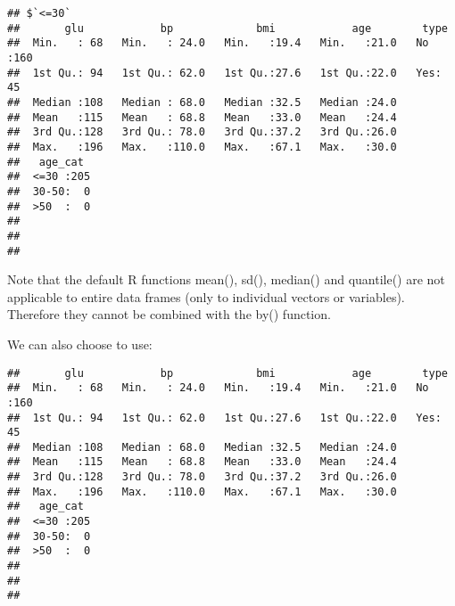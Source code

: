 \documentclass[]{book}
\newenvironment{Shaded}{\begin{snugshade}}{\end{snugshade}}
\newcommand{\KeywordTok}[1]{\textcolor[rgb]{0.13,0.29,0.53}{\textbf{#1}}}
\newcommand{\DecValTok}[1]{\textcolor[rgb]{0.00,0.00,0.81}{#1}}
\newcommand{\OperatorTok}[1]{\textcolor[rgb]{0.81,0.36,0.00}{\textbf{#1}}}
\newcommand{\NormalTok}[1]{#1}
\theoremstyle{definition}
\theoremstyle{definition}
\theoremstyle{definition}
\theoremstyle{remark}
\begin{document}
\begin{verbatim}
## $`<=30`
##       glu            bp             bmi            age        type    
##  Min.   : 68   Min.   : 24.0   Min.   :19.4   Min.   :21.0   No :160  
##  1st Qu.: 94   1st Qu.: 62.0   1st Qu.:27.6   1st Qu.:22.0   Yes: 45  
##  Median :108   Median : 68.0   Median :32.5   Median :24.0            
##  Mean   :115   Mean   : 68.8   Mean   :33.0   Mean   :24.4            
##  3rd Qu.:128   3rd Qu.: 78.0   3rd Qu.:37.2   3rd Qu.:26.0            
##  Max.   :196   Max.   :110.0   Max.   :67.1   Max.   :30.0            
##   age_cat   
##  <=30 :205  
##  30-50:  0  
##  >50  :  0  
##             
##             
## 
\end{verbatim}

Note that the default R functions mean(), sd(), median() and quantile()
are not applicable to entire data frames (only to individual vectors or
variables). Therefore they cannot be combined with the by() function.

We can also choose to use:

\begin{Shaded}
\end{Shaded}

\begin{verbatim}
##       glu            bp             bmi            age        type    
##  Min.   : 68   Min.   : 24.0   Min.   :19.4   Min.   :21.0   No :160  
##  1st Qu.: 94   1st Qu.: 62.0   1st Qu.:27.6   1st Qu.:22.0   Yes: 45  
##  Median :108   Median : 68.0   Median :32.5   Median :24.0            
##  Mean   :115   Mean   : 68.8   Mean   :33.0   Mean   :24.4            
##  3rd Qu.:128   3rd Qu.: 78.0   3rd Qu.:37.2   3rd Qu.:26.0            
##  Max.   :196   Max.   :110.0   Max.   :67.1   Max.   :30.0            
##   age_cat   
##  <=30 :205  
##  30-50:  0  
##  >50  :  0  
##             
##             
## 
\end{verbatim}

\begin{Shaded}
\end{Shaded}
\end{document}
